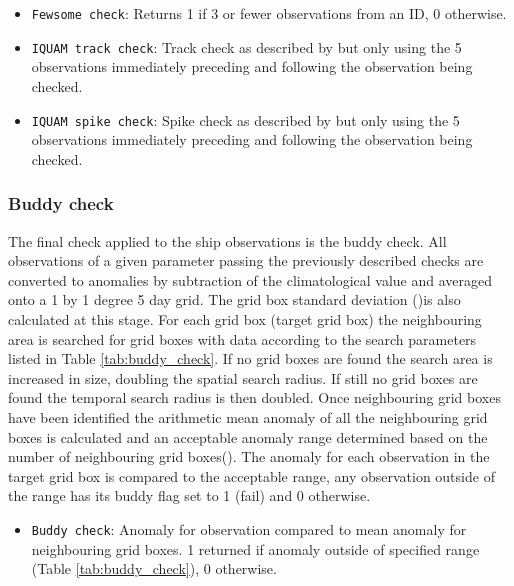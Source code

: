 \begin{itemize}[resume]
\item \texttt{Fewsome check}: Returns 1 if 3 or fewer observations from an ID, 0 otherwise.
\item \texttt{IQUAM track check}: Track check as described by \cite{Xu2014} but only using the 5 observations immediately preceding and following the observation being checked. 
\item \texttt{IQUAM spike check}: Spike check as described by \cite{Xu2014} but only using the 5 observations immediately preceding and following the observation being checked. 
\end{itemize}

\FloatBarrier
\subsubsection{Buddy check}
The final check applied to the ship observations is the buddy check.  
All observations of a given parameter passing the previously described checks are converted to anomalies by subtraction of the climatological value and averaged onto a 1 by 1 degree 5 day grid. 
The grid box standard deviation (\sigma)is also calculated at this stage.
For each grid box (target grid box) the neighbouring area is searched for grid boxes with data according to the search parameters listed in Table \ref{tab:buddy_check}.
If no grid boxes are found the search area is increased in size, doubling the spatial search radius.
If still no grid boxes are found the temporal search radius is then doubled.
Once neighbouring grid boxes have been identified the arithmetic mean anomaly of all the neighbouring grid boxes is calculated and an acceptable anomaly range determined based on the number of neighbouring grid boxes(\mu).
The anomaly for each observation in the target grid box is compared to the acceptable range, any observation outside of the range has its buddy flag set to 1 (fail) and 0 otherwise.
\begin{itemize}[resume]
\item \texttt{Buddy check}: Anomaly for observation compared to mean anomaly for neighbouring grid boxes. 1 returned if anomaly outside of specified range (Table \ref{tab:buddy_check}), 0 otherwise.
\end{itemize}


